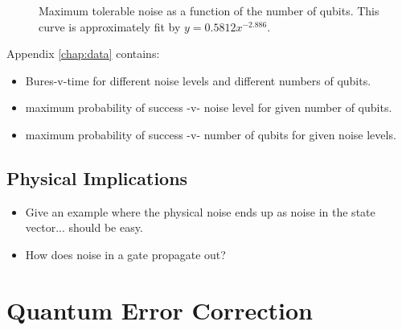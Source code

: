 \begin{figure}[h]
\begin{center}
\end{center}
\caption{Maximum tolerable noise as a function of the number of qubits.
This curve is approximately fit by $y = 0.5812 x^{-2.886}$.}
\label{fig:results}
\end{figure}

Appendix \ref{chap:data} contains:
\begin{itemize}
\item Bures-v-time for different noise levels and different numbers of qubits.
\item maximum probability of success -v- noise level for given number of qubits.
\item maximum probability of success -v- number of qubits for given noise levels.
\end{itemize}



\subsection{Physical Implications}

\begin{itemize}
\item Give an example where the physical noise ends up as noise
in the state vector... should be easy.
\item How does noise in a gate propagate out?
\end{itemize}


\section{Quantum Error Correction}

